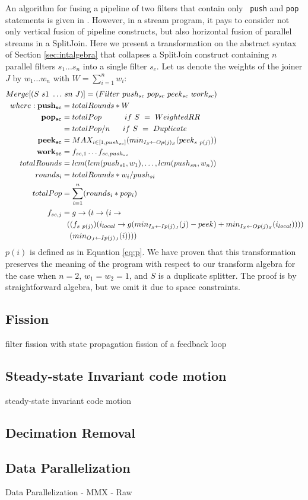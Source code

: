 An algorithm for fusing a pipeline of two filters that contain only {\tt
push} and {\tt pop} statements is given in \cite{pro96}.  However, in a
stream program, it pays to consider not only vertical fusion of pipeline
constructs, but also horizontal fusion of parallel streams in a
SplitJoin.  Here we present a transformation on the abstract syntax of
Section \ref{sec:intalgebra} that collapses a SplitJoin construct
containing $n$ parallel filters $s_1 \dots s_n$ into a single filter
$s_c$.  Let us denote the weights of the joiner $J$ by $w_1 \dots w_n$
with $W = \sum_{i=1}^{n}{w_i}$:
\begin{align*}
Merge[(S~s1~\dots&~sn~J)] = (Filter~push_{sc}~pop_{sc}~peek_{sc}~work_{sc}) \\
where: {\bf push_{sc}} &= totalRounds * W \\
       {\bf pop_{sc}} &= totalPop ~~~~~~~~~if~S~=~WeightedRR \\
                &= totalPop / n ~~~~~if~S~=~Duplicate \\
       {\bf peek_{sc}} &= MAX_{i \in [1,push_{sc}]}(min_{I_S \leftarrow Op(j)_S}(peek_{s~p(j)})) \\
       {\bf work_{sc}} &= f_{sc, 1} \dots f_{sc, push_{sc}} \\
       totalRounds &= lcm(lcm(push_{s1}, w_1), \dots, lcm(push_{sn},
       w_n)) \\
       rounds_i &= totalRounds * w_i  / push_{si} \\
       totalPop &= \sum_{i=1}^{n}(rounds_i*pop_i) \\
       f_{sc, j} &= g \rightarrow (t \rightarrow (i \rightarrow \\ 
~&~~((f_{s~p(j)})(i_{local} \rightarrow g(min_{I_S \leftarrow Ip(j)_J}(j) - peek) + min_{I_S \leftarrow Op(j)_S}(i_{local})))) \\
    ~&~~~(min_{O_J \leftarrow Ip(j)_J}(i))))
\end{align*}
$p(i)$ is defined as in Equation \ref{eq:p}.  We have proven that this
transformation preserves the meaning of the program with respect to our
transform algebra for the case when $n = 2$, $w_1 = w_2 = 1$, and $S$ is
a duplicate splitter.  The proof is by straightforward algebra, but we
omit it due to space constraints.

\subsection{Fission}

filter fission with state propagation
fission of a feedback loop

\subsection{Steady-state Invariant code motion}

steady-state invariant code motion

\subsection{Decimation Removal}

\subsection{Data Parallelization}

Data Parallelization
-	MMX
-	Raw

